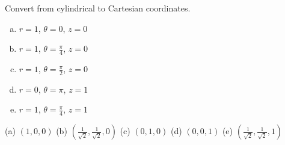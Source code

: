 \begin{question}
Convert from cylindrical to Cartesian coordinates.
\begin{enumerate}[(a)]
\item
$r=1$, $\theta=0$, $z=0$
\item
$r=1$, $\theta=\frac{\pi}{4}$, $z=0$
\item
$r=1$, $\theta=\frac{\pi}{2}$, $z=0$
\item
$r=0$, $\theta=\pi$, $z=1$
\item
$r=1$, $\theta=\frac{\pi}{4}$, $z=1$
\end{enumerate}

\end{question}

%

\begin{answer}
(a) $(1,0,0)$\qquad
(b) $\left(\frac{1}{\sqrt{2}},\frac{1}{\sqrt{2}},0\right)$\qquad
(c) $(0,1,0)$\qquad
(d) $(0,0,1)$\qquad
(e) $\left(\frac{1}{\sqrt{2}},\frac{1}{\sqrt{2}},1\right)$
\end{answer}

